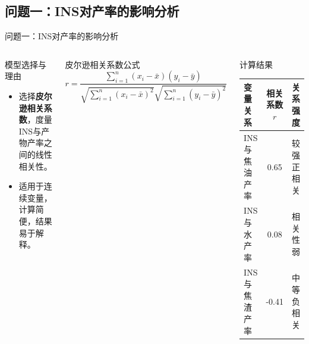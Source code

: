 \documentclass{beamer}
\begin{document}
\subsection{问题一：INS对产率的影响分析}
\begin{frame}{问题一：INS对产率的影响分析}
    \justifying
    \begin{columns}
        \begin{block}{模型选择与理由}
            \begin{itemize}
                \item 选择\textbf{皮尔逊相关系数}，度量INS与产物产率之间的线性相关性。
                \item 适用于连续变量，计算简便，结果易于解释。
            \end{itemize}
        \end{block}
        \begin{block}{皮尔逊相关系数公式}
            \[
            r = \frac{\sum_{i=1}^n (x_i - \bar{x})(y_i - \bar{y})}{\sqrt{\sum_{i=1}^n (x_i - \bar{x})^2} \sqrt{\sum_{i=1}^n (y_i - \bar{y})^2}}
            \]
        \end{block}
        \begin{block}{计算结果}
            \begin{table}[htbp]
                \centering
                \begin{tabular}{lcc}
                    \toprule
                    \textbf{变量关系} & \textbf{相关系数$r$} & \textbf{关系强度} \\
                    \midrule
                    INS与焦油产率 & 0.65 & 较强正相关 \\
                    INS与水产率 & 0.08 & 相关性弱 \\
                    INS与焦渣产率 & -0.41 & 中等负相关 \\
                    \bottomrule
                \end{tabular}
            \end{table}
        \end{block}
    \end{columns}
\end{frame}
\end{document}
